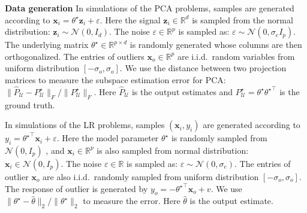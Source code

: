 \documentclass[11pt]{article}
\begin{document}

\textbf{Data generation} In  simulations of the PCA problems, samples are generated according to $\mathbf{x}_i = \theta^\star\mathbf{z}_i + \varepsilon$. Here the signal $\mathbf{z}_i \in \mathbb{R}^d$ is sampled from the normal distribution: $\mathbf{z}_i \sim \mathcal{N}(0,I_d)$. The noise $\varepsilon \in \mathbb{R}^p$ is sampled as:  $\varepsilon \sim \mathcal{N}(0,\sigma_e I_p)$. The underlying matrix $\theta^\star \in \mathbb{R}^{p\times d}$ is randomly generated whose columns are then orthogonalized. The entries of outliers $\mathbf{x}_o \in \mathbb{R}^p$ are i.i.d.\ random variables from uniform distribution $[-\sigma_o,\sigma_o]$.
We use the distance between two projection matrices to measure the subspace estimation error for PCA: $\|\widehat{P}_\mathcal{U}-P_\mathcal{U}^\star\|_F/\|P_\mathcal{U}^\star\|_F$. Here $\widehat{P}_\mathcal{U}$ is the output estimates and $P_{\mathcal{U}}^\star=\theta^\star {\theta^\star}^\top$ is the ground truth.


In  simulations of the LR problems, samples $(\mathbf{x}_i,y_i)$ are generated according to $y_i = {\theta^\star}^\top \mathbf{x}_i + \varepsilon$. Here the model parameter $\theta^\star$ is randomly sampled from $\mathcal{N}(0,I_p)$ , and $\mathbf{x}_i \in \mathbb{R}^p$ is also sampled from normal distribution: $\mathbf{x}_i \in \mathcal{N}(0,I_p)$. The noise $\varepsilon \in \mathbb{R}$ is sampled as:  $\varepsilon \sim \mathcal{N}(0,\sigma_e)$. The entries of outlier $\mathbf{x}_o$ are also i.i.d.\ randomly sampled from uniform distribution $[-\sigma_o,\sigma_o]$. The response of outlier is generated by $y_o = -{\theta^\star}^\top \mathbf{x}_o + v$. We use $\|\theta^\star-\widehat{\theta}\|_2/\|\theta^\star\|_2$ to measure the error. Here $\widehat{\theta}$ is the output estimate.
\end{document}

